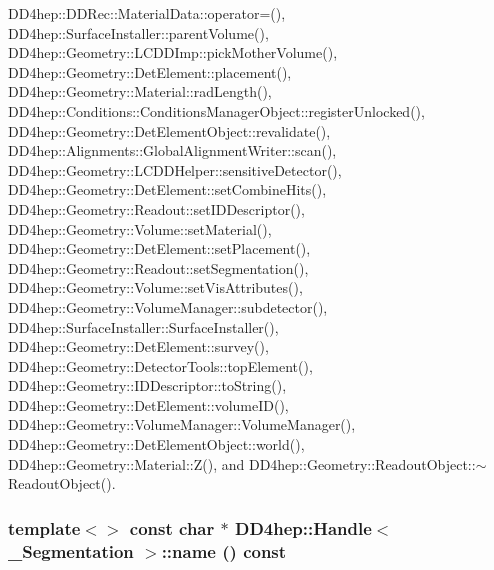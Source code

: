 DD4hep::DDRec::MaterialData::operator=(), DD4hep::SurfaceInstaller::parentVolume(), DD4hep::Geometry::LCDDImp::pickMotherVolume(), DD4hep::Geometry::DetElement::placement(), DD4hep::Geometry::Material::radLength(), DD4hep::Conditions::ConditionsManagerObject::registerUnlocked(), DD4hep::Geometry::DetElementObject::revalidate(), DD4hep::Alignments::GlobalAlignmentWriter::scan(), DD4hep::Geometry::LCDDHelper::sensitiveDetector(), DD4hep::Geometry::DetElement::setCombineHits(), DD4hep::Geometry::Readout::setIDDescriptor(), DD4hep::Geometry::Volume::setMaterial(), DD4hep::Geometry::DetElement::setPlacement(), DD4hep::Geometry::Readout::setSegmentation(), DD4hep::Geometry::Volume::setVisAttributes(), DD4hep::Geometry::VolumeManager::subdetector(), DD4hep::SurfaceInstaller::SurfaceInstaller(), DD4hep::Geometry::DetElement::survey(), DD4hep::Geometry::DetectorTools::topElement(), DD4hep::Geometry::IDDescriptor::toString(), DD4hep::Geometry::DetElement::volumeID(), DD4hep::Geometry::VolumeManager::VolumeManager(), DD4hep::Geometry::DetElementObject::world(), DD4hep::Geometry::Material::Z(), and DD4hep::Geometry::ReadoutObject::$\sim$ReadoutObject().\hypertarget{class_d_d4hep_1_1_handle_ae67b99a35c987f292e426386d6a28552}{
\subsubsection[{name}]{\setlength{\rightskip}{0pt plus 5cm}template$<$$>$ const char $\ast$ {\bf DD4hep::Handle}$<$ {\bf \_\-Segmentation} $>$::name () const}}
\label{class_d_d4hep_1_1_handle_ae67b99a35c987f292e426386d6a28552}


